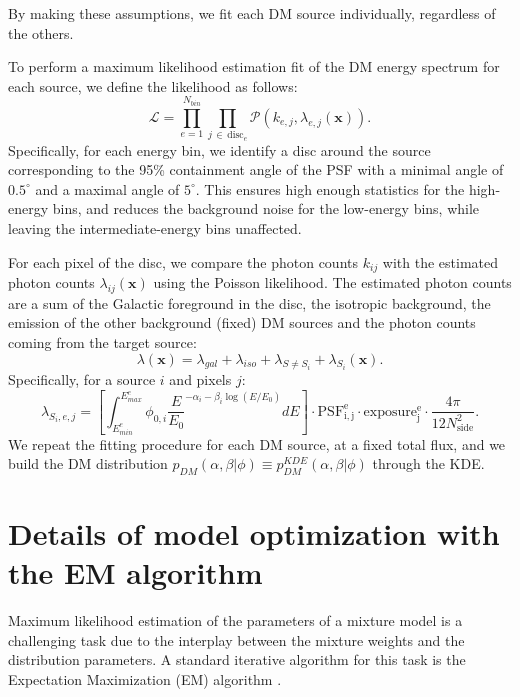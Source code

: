 \documentclass[12pt, a4paper]{article}
\newcommand{\bx}{\textbf{x}}
\begin{document}
By making these assumptions, we fit each DM source individually, regardless of the others.

To perform a maximum likelihood estimation fit of the DM energy spectrum for each source, we define the likelihood as follows:
\begin{equation}
    \mathcal{L} = \prod_{e=1}^{N_{bin}} \prod_{j \, \in \, \textrm{disc}_e}  
    \mathcal{P}(k_{e,j}, \lambda_{e,j}(\bx)).
\end{equation}
Specifically, for each energy bin, we identify a disc around the source corresponding to the 95\% containment angle of the PSF with a minimal angle of $0.5^\circ$ and a maximal angle of $5^\circ$.
This ensures high enough statistics for the high-energy bins, and reduces the background noise for the low-energy bins, while leaving the intermediate-energy bins unaffected. 


For each pixel of the disc, we compare the photon counts $k_{ij}$ with the estimated photon counts $\lambda_{ij}(\bx)$ using the Poisson likelihood. The estimated photon counts are a sum of the Galactic foreground in the disc, the isotropic background, the emission of the other background (fixed) DM sources and the photon counts coming from the target source:
\begin{equation}
    \lambda(\bx) = \lambda_{gal} + \lambda_{iso} + \lambda_{S \neq S_i} + \lambda_{S_i}(\bx).
\end{equation}
Specifically, for a source $i$ and pixels $j$:
\begin{equation}
    \lambda_{S_i, e,j} = \left[\int_{E_{min}^e}^{E_{max}^e} \phi_{0,i}\frac{E}{E_0}^{-\alpha_i - \beta_i\log(E/E_0)} dE\right] \cdot \mathrm{PSF_{i,j}^e} \cdot \mathrm{exposure_{j}^e} \cdot \frac{4\pi}{12 N_\mathrm{side}^2}.
    \label{eq:lambda}
\end{equation}
We repeat the fitting procedure for each DM source, at a fixed total flux, and we build the DM distribution $p_{DM}(\alpha, \beta|\phi)\equiv p_{DM}^{KDE}(\alpha, \beta|\phi)$ through the KDE.

\section{Details of model optimization with the EM algorithm}
\label{app:EM}

Maximum likelihood estimation of the parameters of a mixture model is a challenging task due to the interplay between the mixture weights and the distribution parameters. 
A standard iterative algorithm for this task is the  Expectation Maximization (EM) algorithm \cite{bishop,hastie2009elements}. 
\end{document}
